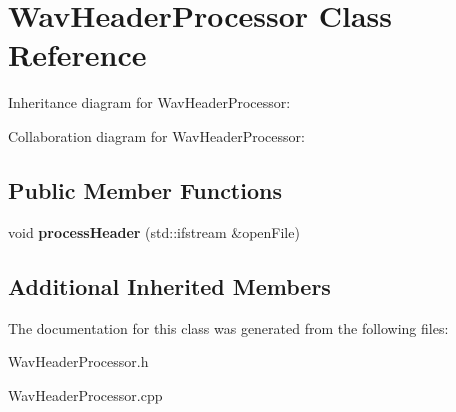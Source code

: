 \hypertarget{classWavHeaderProcessor}{}\section{Wav\+Header\+Processor Class Reference}
\label{classWavHeaderProcessor}


Inheritance diagram for Wav\+Header\+Processor\+:


Collaboration diagram for Wav\+Header\+Processor\+:
\subsection*{Public Member Functions}
\begin{DoxyCompactItemize}
\item 
\mbox{\label{classWavHeaderProcessor_a4aba005a7763bd7cf996d039babd0791}} 
void {\bfseries process\+Header} (std\+::ifstream \&open\+File)
\end{DoxyCompactItemize}
\subsection*{Additional Inherited Members}


The documentation for this class was generated from the following files\+:\begin{DoxyCompactItemize}
\item 
Wav\+Header\+Processor.\+h\item 
Wav\+Header\+Processor.\+cpp\end{DoxyCompactItemize}

